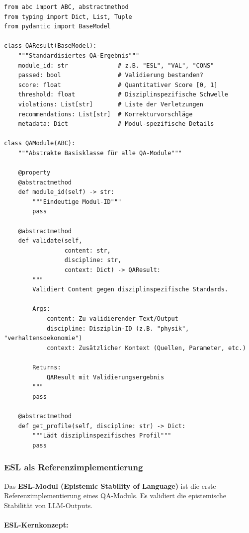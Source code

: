 \begin{lstlisting}[caption={Generische QA-Modul-Schnittstelle}]
from abc import ABC, abstractmethod
from typing import Dict, List, Tuple
from pydantic import BaseModel

class QAResult(BaseModel):
    """Standardisiertes QA-Ergebnis"""
    module_id: str              # z.B. "ESL", "VAL", "CONS"
    passed: bool                # Validierung bestanden?
    score: float                # Quantitativer Score [0, 1]
    threshold: float            # Disziplinspezifische Schwelle
    violations: List[str]       # Liste der Verletzungen
    recommendations: List[str]  # Korrekturvorschläge
    metadata: Dict              # Modul-spezifische Details

class QAModule(ABC):
    """Abstrakte Basisklasse für alle QA-Module"""

    @property
    @abstractmethod
    def module_id(self) -> str:
        """Eindeutige Modul-ID"""
        pass

    @abstractmethod
    def validate(self,
                 content: str,
                 discipline: str,
                 context: Dict) -> QAResult:
        """
        Validiert Content gegen disziplinspezifische Standards.

        Args:
            content: Zu validierender Text/Output
            discipline: Disziplin-ID (z.B. "physik", "verhaltensoekonomie")
            context: Zusätzlicher Kontext (Quellen, Parameter, etc.)

        Returns:
            QAResult mit Validierungsergebnis
        """
        pass

    @abstractmethod
    def get_profile(self, discipline: str) -> Dict:
        """Lädt disziplinspezifisches Profil"""
        pass
\end{lstlisting}

\subsubsection{ESL als Referenzimplementierung}

Das \textbf{ESL-Modul (Epistemic Stability of Language)} ist die erste Referenzimplementierung eines QA-Moduls. Es validiert die epistemische Stabilität von LLM-Outputs.

\paragraph{ESL-Kernkonzept:}

